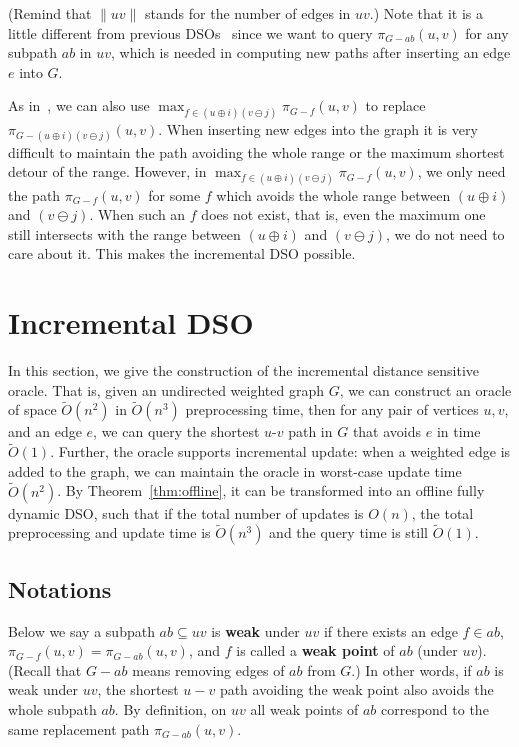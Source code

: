 \documentclass[11pt]{article}
\theoremstyle{plain}
\theoremstyle{definition}
\newcommand{\too}[1]{\tilde{O}({#1})}
\newcommand{\og}[3]{\pi_{G-#3}\left(#1,#2\right)}
\begin{document}
(Remind that $\|uv\|$ stands for the number of edges in $uv$.) Note that it is a little different from previous DSOs~\cite{Demetrescu2008,2009A} since we want to query $\pi_{G-ab}(u,v)$ for any subpath $ab$ in $uv$, which is needed in computing new paths after inserting an edge $e$ into $G$.

As in~\cite{2009A}, we can also use $\max_{f\in (u \oplus i)(v \ominus j)}\og{u}{v}{f}$ to replace $\og{u}{v}{(u \oplus i)(v \ominus j)}$. When inserting new edges into the graph it is very difficult to maintain the path avoiding the whole range or the maximum shortest detour of the range.
However, in $\max_{f\in (u \oplus i)(v \ominus j)}\og{u}{v}{f}$, we only need the path $\og{u}{v}{f}$ for some $f$ which avoids the whole range between $(u \oplus i)$ and $(v \ominus j)$. When such an $f$ does not exist, that is, even the maximum one still intersects with the range between $(u \oplus i)$ and $(v \ominus j)$, we do not need to care about it. This makes the incremental DSO possible. \section{Incremental DSO}\label{sec-inc}

In this section, we give the construction of the incremental distance sensitive oracle. That is, given an undirected weighted graph $G$,  we can construct an oracle of space $\tilde{O}(n^2)$ in $\too{n^3}$ preprocessing time, then for any pair of vertices $u,v$, and an edge $e$, we can query the shortest $u$-$v$ path in $G$ that avoids $e$ in time $\too{1}$. Further, the oracle supports incremental update: when a weighted edge is added to the graph, we can maintain the oracle in worst-case update time $\too{n^2}$. By Theorem~\ref{thm:offline}, it can be transformed into an offline fully dynamic DSO, such that if the total number of updates is $O(n)$, the total preprocessing and update time is $\tilde{O}(n^3)$ and the query time is still $\tilde{O}(1)$.



\subsection{Notations}

Below we say a subpath $ab \subseteq uv$ is \textbf{weak} under $uv$ if there exists an edge $f \in ab$, $\og{u}{v}{f} = \og{u}{v}{ab}$, and $f$ is called a \textbf{weak point} of $ab$ (under $uv$). (Recall that $G-ab$ means removing edges of $ab$ from $G$.) In other words, if $ab$ is weak under $uv$, the shortest $u-v$ path avoiding the weak point also avoids the whole subpath $ab.$ By definition, on $uv$ all weak points of $ab$ correspond to the same replacement path $\og{u}{v}{ab}$. 
\end{document}
